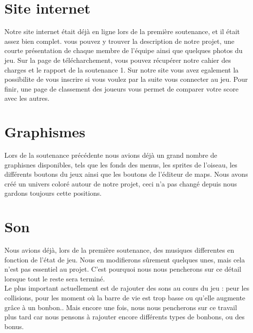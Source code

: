 \documentclass [11pt]{report}
\begin{document}
		\vspace{10mm}
		
		
	\section{Site internet}
	
	\vspace{5mm}
	
		Notre site internet était déj\`a en ligne lors de la premi\`ere soutenance, et il était assez bien complet. vous pouvez y trouver la description de notre projet, une courte  présentation de chaque membre de l'équipe ainsi que quelques photos du jeu. Sur la page de télécharchement, vous pouvez récupérer notre cahier des charges et le rapport de la soutenance 1. Sur notre site vous avez egalement la possibilite de vous inscrire si vous voulez par la suite vous connecter au jeu. Pour finir, une page de classement des joueurs vous permet de comparer votre score avec les autres. 
		
		\vspace{15mm}
		
	\section{Graphismes}
	
	\vspace{5mm}
		
		Lors de la soutenance précédente nous avions déj\`a un grand nombre de graphisnes disponibles, tels que les fonds des menus, les sprites de l'oiseau, les différents boutons du jeux ainsi que les boutons de l'éditeur de maps. Nous avons créé un univers coloré autour de notre projet, ceci n'a pas changé depuis nous gardons toujours cette positions.
		
		\vspace{10mm}
		
	\section{Son}
	
	\vspace{3mm}
	
		Nous avions déjà, lors de la première soutenance, des musiques differentes en fonction de l'état de jeu. Nous en modifierons sûrement quelques unes, mais cela n'est pas essentiel au projet. C'est pourquoi nous nous pencherons sur ce détail lorsque tout le reste sera termin\'e.\\
		\indent Le plus important actuellement est de rajouter des sons au cours du jeu : peur les collisions, pour les moment où la barre de vie est trop basse ou qu'elle augmente grâce à un bonbon.. Mais encore une fois, nous nous pencherons sur ce travail plus tard car nous pensons \`a rajouter encore différents types de bonbons, ou des bonus.
		
\end{document}
